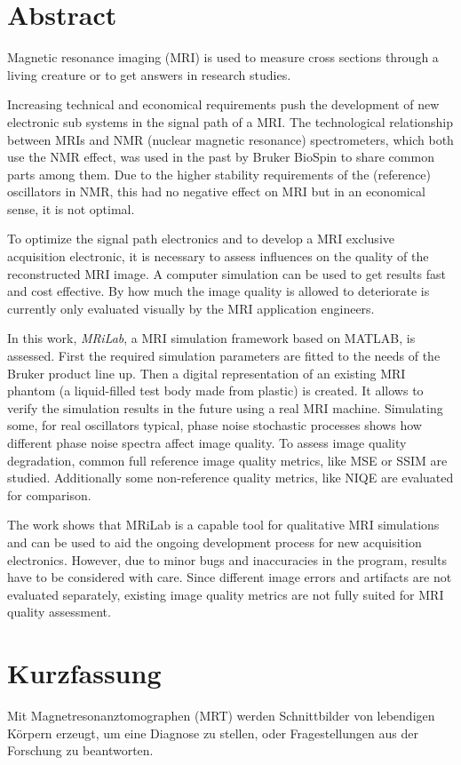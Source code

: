 \chapter*{Abstract}
Magnetic resonance imaging (MRI) is used to measure cross sections through a living creature or to get answers in research studies.

Increasing technical and economical requirements push the development of new electronic sub systems in the signal path of a MRI. The technological relationship between MRIs and NMR (nuclear magnetic resonance) spectrometers, which both use the NMR effect, was used in the past by Bruker BioSpin to share common parts among them.
Due to the higher stability requirements of the (reference) oscillators in NMR, this had no negative effect on MRI but in an economical sense, it is not optimal.

To optimize the signal path electronics and to develop a MRI exclusive acquisition electronic, it is necessary to assess influences on the quality of the reconstructed MRI image. A computer simulation can be used to get results fast and cost effective. By how much the image quality is allowed to deteriorate is currently only evaluated visually by the MRI application engineers.

In this work, \textit{MRiLab}, a MRI simulation framework based on MATLAB, is assessed. First the required simulation parameters are fitted to the needs of the Bruker product line up. Then a digital representation of an existing MRI phantom (a liquid-filled test body made from plastic) is created. It allows to verify the simulation results in the future using a real MRI machine.
Simulating some, for real oscillators typical, phase noise stochastic processes shows how different phase noise spectra affect image quality. To assess image quality degradation, common full reference image quality metrics, like MSE or SSIM are studied. Additionally some non-reference quality metrics, like NIQE are evaluated for comparison.

The work shows that MRiLab is a capable tool for qualitative MRI simulations and can be used to aid the ongoing development process for new acquisition electronics. However, due to minor bugs and inaccuracies in the program, results have to be considered with care. Since different image errors and artifacts are not evaluated separately, existing image quality metrics are not fully suited for MRI quality assessment.

\chapter*{Kurzfassung}
Mit Magnetresonanztomographen (MRT) werden Schnittbilder von lebendigen Körpern erzeugt, um eine Diagnose zu stellen, oder Fragestellungen aus der Forschung zu beantworten.

